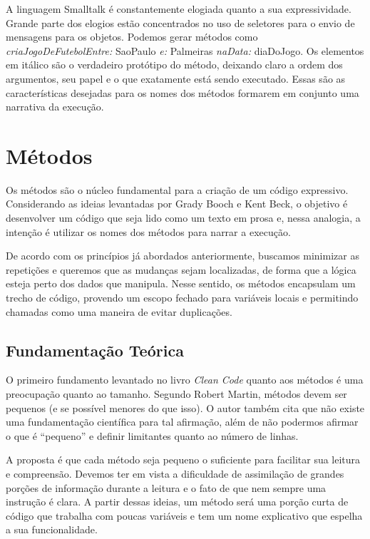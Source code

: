 A linguagem Smalltalk é constantemente elogiada quanto a sua expressividade. Grande parte dos elogios estão concentrados no uso de seletores para o envio de mensagens para os objetos. Podemos gerar métodos como \textit{criaJogoDeFutebolEntre:} SaoPaulo \textit{e:} Palmeiras \textit{naData:} diaDoJogo. Os elementos em itálico são o verdadeiro protótipo do método, deixando claro a ordem dos argumentos, seu papel e o que exatamente está sendo executado. Essas são as características desejadas para os nomes dos métodos formarem em conjunto uma narrativa da execução.

\section{Métodos}
\label{sec:metodos}

Os métodos são o núcleo fundamental para a criação de um código expressivo. Considerando as ideias levantadas por Grady Booch e Kent Beck, o objetivo é desenvolver um código que seja lido como um texto em prosa e, nessa analogia, a intenção é utilizar os nomes dos métodos para narrar a execução.
	
De acordo com os princípios já abordados anteriormente, buscamos minimizar as repetições e queremos que as mudanças sejam localizadas, de forma que a lógica esteja perto dos dados que manipula. Nesse sentido, os métodos encapsulam um trecho de código, provendo um escopo fechado para variáveis locais e permitindo chamadas como uma maneira de evitar duplicações.

\subsection{Fundamentação Teórica}
O primeiro fundamento levantado no livro \textit{Clean Code} quanto aos métodos é uma preocupação quanto ao tamanho. Segundo Robert Martin, métodos devem ser pequenos (e se possível menores do que isso). O autor também cita que não existe uma fundamentação científica para tal afirmação, além de não podermos afirmar o que é “pequeno” e definir limitantes quanto ao número de linhas.
	
A proposta é que cada método seja pequeno o suficiente para facilitar sua leitura e compreensão. Devemos ter em vista a dificuldade de assimilação de grandes porções de informação durante a leitura e o fato de que nem sempre uma instrução é clara. A partir dessas ideias, um método será uma porção curta de código que trabalha com poucas variáveis e tem um nome explicativo que espelha a sua funcionalidade.
	
